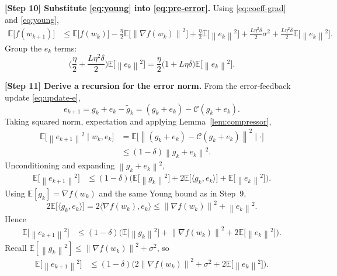 \documentclass{article}
\newcommand{\E}{\mathbb{E}}
\newcommand{\norm}[1]{\left\|#1\right\|}
\newcommand{\inner}[2]{\langle #1,#2\rangle}
\begin{document}
\noindent\textbf{[Step 10] Substitute \eqref{eq:young} into \eqref{eq:pre-error}.}  
Using \eqref{eq:coeff-grad} and \eqref{eq:young},
\begin{align}
    \E\!\big[f(w_{k+1})\big]
    &\le \E\!\big[f(w_k)\big]
       -\frac{\eta}{2}\E\!\big[\norm{\nabla f(w_k)}^2\big]
       +\frac{\eta}{2}\E\!\big[\norm{e_k}^2\big]
       +\frac{L\eta^2\delta}{2}\sigma^2
       +\frac{L\eta^2\delta}{2}\E\!\big[\norm{e_k}^2\big] .
    \label{eq:after-young}
\end{align}
Group the $e_k$ terms:
\[
    \Big(\frac{\eta}{2}+ \frac{L\eta^2\delta}{2}\Big)\E\!\big[\norm{e_k}^2\big]
    = \frac{\eta}{2}\big(1+L\eta\delta\big)\E\!\big[\norm{e_k}^2\big].
\]

\noindent\textbf{[Step 11] Derive a recursion for the error norm.}  
From the error‑feedback update \eqref{eq:update-e},
\[
    e_{k+1}=g_k+e_k-\tilde g_k = (g_k+e_k)-\mathcal{C}(g_k+e_k).
\]
Taking squared norm, expectation and applying Lemma~\ref{lem:compressor},
\begin{align}
    \E\!\big[\norm{e_{k+1}}^2\mid w_k,e_k\big]
    &= \E\!\big[\norm{(g_k+e_k)-\mathcal{C}(g_k+e_k)}^2\mid\cdot\big] \nonumber\\
    &\le (1-\delta)\norm{g_k+e_k}^2 .
    \label{eq:error-rec}
\end{align}
Unconditioning and expanding $\norm{g_k+e_k}^2$,
\begin{align}
    \E\!\big[\norm{e_{k+1}}^2\big]
    &\le (1-\delta)\Big(\E\!\big[\norm{g_k}^2\big]+2\E\!\big[\inner{g_k}{e_k}\big]
          +\E\!\big[\norm{e_k}^2\big]\Big).
\end{align}
Using $\E[g_k]=\nabla f(w_k)$ and the same Young bound as in Step~9,
\[
    2\E\!\big[\inner{g_k}{e_k}\big]
    =2\inner{\nabla f(w_k)}{e_k}
    \le \norm{\nabla f(w_k)}^2+\norm{e_k}^2 .
\]
Hence
\begin{align}
    \E\!\big[\norm{e_{k+1}}^2\big]
    &\le (1-\delta)\Big(\E\!\big[\norm{g_k}^2\big]+\norm{\nabla f(w_k)}^2
          +2\E\!\big[\norm{e_k}^2\big]\Big) .
    \label{eq:error-expanded}
\end{align}
Recall $\E[\norm{g_k}^2]\le \norm{\nabla f(w_k)}^2+\sigma^2$,
so
\begin{align}
    \E\!\big[\norm{e_{k+1}}^2\big]
    &\le (1-\delta)\Big(2\norm{\nabla f(w_k)}^2+\sigma^2+2\E\!\big[\norm{e_k}^2\big]\Big) .
    \label{eq:error-final}
\end{align}
\end{document}
